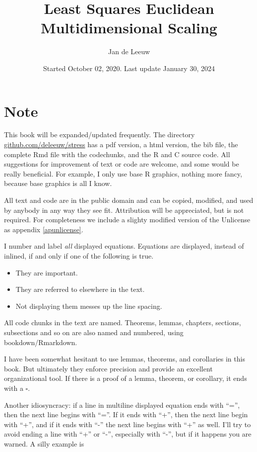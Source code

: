 \documentclass[
  12pt,
]{book}
\title{Least Squares Euclidean Multidimensional Scaling}
\author{Jan de Leeuw}
\date{Started October 02, 2020. Last update January 30, 2024}
\providecommand{\tightlist}{%
  \setlength{\itemsep}{0pt}\setlength{\parskip}{0pt}}
\begin{document}
\maketitle

{
\setcounter{tocdepth}{4}
\tableofcontents
}
\chapter*{Note}\label{note}

This book will be expanded/updated frequently. The directory
\href{https://github.com/deleeuw/stress}{github.com/deleeuw/stress}
has a pdf version, a html version, the bib file, the complete Rmd
file with the codechunks, and the R and C source code. All suggestions for improvement
of text or code are welcome, and some would be really beneficial. For
example, I only use base R graphics, nothing more fancy, because base
graphics is all I know.

All text and code are in the public domain and can be copied, modified,
and used by anybody in any way they see fit. Attribution will be
appreciated, but is not required. For completeness we include a slighty
modified version of the Unlicense as appendix \ref{apunlicense}.

I number and label \emph{all} displayed equations. Equations are displayed,
instead of inlined, if and only if one of the following is true.

\begin{itemize}
\tightlist
\item
  They are important.
\item
  They are referred to elsewhere in the text.
\item
  Not displaying them messes up the line spacing.
\end{itemize}

All code chunks in the text are named. Theorems, lemmas, chapters,
sections, subsections and so on are also named and numbered, using
bookdown/Rmarkdown.

I have been somewhat hesitant to use lemmas, theorems, and corollaries
in this book. But ultimately they enforce precision and provide an excellent organizational tool. If there is a proof of a lemma, theorem, or corollary, it
ends with a \(\square\).

Another idiosyncracy: if a line in multiline displayed equation ends
with ``='', then the next line begins with ``=''. If it ends with ``+'', then
the next line begin with ``+'', and if it ends with ``-'' the next line
begins with ``+'' as well. I'll try to avoid ending a line with ``+'' or
``-'', especially with ``-'', but if it happens you are warned. A silly
example is
\end{document}
